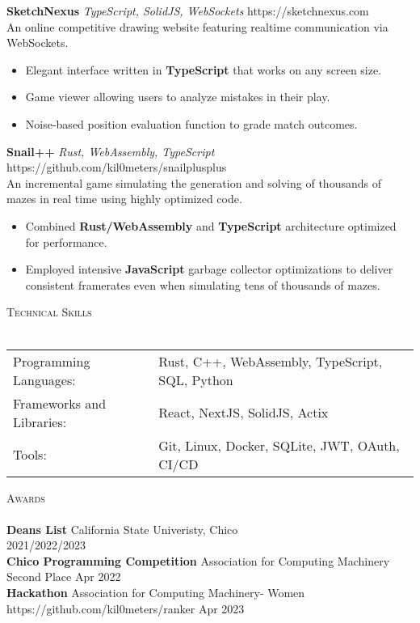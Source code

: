\documentclass[letterpaper]{article}
\newcommand{\lineunder} {
    \vspace*{-8pt} \\
    \hspace*{-18pt} \hrulefill \\
}
\newcommand{\header} [1] {
    {\hspace*{-18pt}\vspace*{6pt} \textsc{#1}}
    \vspace*{-6pt} \lineunder
}
\begin{document}
\vspace*{2mm}
{\textbf{SketchNexus}} {\sl TypeScript, SolidJS, WebSockets} \hfill https://sketchnexus.com\\
An online competitive drawing website featuring realtime communication via WebSockets.\\

    \begin{itemize}
      \item Elegant interface written in \textbf{TypeScript} that works on any screen size.
      \item Game viewer allowing users to analyze mistakes in their play.
      \item Noise-based position evaluation function to grade match outcomes.
    \end{itemize}

\vspace*{2mm}
{\textbf{Snail++}} {\sl Rust, WebAssembly, TypeScript} \hfill https://github.com/kil0meters/snailplusplus\\
An incremental game simulating the generation and solving of thousands of mazes in real time using highly optimized code.\\

    \begin{itemize}
      \item Combined \textbf{Rust/WebAssembly} and \textbf{TypeScript} architecture optimized for performance.
      \item Employed intensive \textbf{JavaScript} garbage collector optimizations to deliver consistent framerates even when simulating tens of thousands of mazes.
    \end{itemize}

\vspace*{2mm}

\header{Technical Skills}
\begin{tabular}{ l l }
	Programming Languages:    & Rust, C++, WebAssembly, TypeScript, SQL, Python \\
	Frameworks and Libraries: & React, NextJS, SolidJS, Actix                   \\
	Tools:                    & Git, Linux, Docker, SQLite, JWT, OAuth, CI/CD   \\
\end{tabular}
\vspace{2mm}

\header{Awards}
\textbf{Dean\textquotesingle{}s List} \hfill California State Univeristy, Chico\\
\hfill 2021/2022/2023\\
\vspace*{2mm}
\textbf{Chico Programming Competition} \hfill Association for Computing Machinery\\
Second Place \hfill Apr 2022\\
\textbf{Hackathon} \hfill Association for Computing Machinery- Women\\
https://github.com/kil0meters/ranker \hfill Apr 2023\\
\vspace*{2mm}

\
\end{document}
